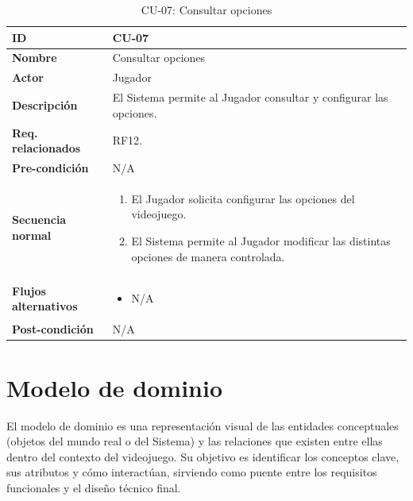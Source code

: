 \begin{table}[H]
	\centering
	\begin{tabular}{|p{3cm}|p{14cm}|}
		\hline \textbf{ID} & CU-07 \\
		\hline \textbf{Nombre} & Consultar opciones \\
		\hline \textbf{Actor} & Jugador \\
		\hline \textbf{Descripción} & El Sistema permite al Jugador consultar y configurar las opciones. \\
		\hline \textbf{Req. relacionados} & RF12. \\
		\hline \textbf{Pre-condición} & N/A \\
		\hline
		\textbf{Secuencia normal} &
		\begin{enumerate}[nosep, before=\vspace{-0.4\baselineskip}]
			\item El Jugador solicita configurar las opciones del videojuego.
			\item El Sistema permite al Jugador modificar las distintas opciones de manera controlada.
		\end{enumerate} \\
		\hline
		\textbf{Flujos alternativos} &
		\begin{itemize}[nosep, before=\vspace{-0.4\baselineskip}]
			\item N/A
		\end{itemize} \\
		\hline \textbf{Post-condición} & N/A \\
		\hline
	\end{tabular}
	\caption{CU-07: Consultar opciones}
	\label{tab:cu07}
\end{table}

\clearpage

\section{Modelo de dominio}

El modelo de dominio es una representación visual de las entidades conceptuales (objetos del mundo real o del Sistema) y las relaciones que existen entre ellas dentro del contexto del videojuego. Su objetivo es identificar los conceptos clave, sus atributos y cómo interactúan, sirviendo como puente entre los requisitos funcionales y el diseño técnico final.

